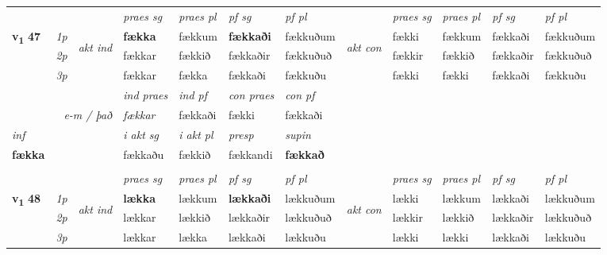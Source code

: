 \begin{longtable}[l]{X>{\footnotesize\itshape}llXXXXlXXXX}
 & &   & \textit{praes sg}  & \textit{praes pl}    & \textit{ pf sg} & \textit{pf pl} & & \textit{praes sg}  & \textit{praes pl}    & \textit{pf sg} & \textit{pf pl }  \\ \cmidrule{4-7} \cmidrule{9-12}
 \multirow{2}{*}{{{\textbf{v{\textsubscript{1}}} \Large{\textbf{47}}}}}  & 1p & \multirow{3}{*}{\begin{turn}{90}\textit{akt ind}\end{turn}} & \textbf{fækka} & fækkum & \textbf{fækkaði} & fækkuðum & \multirow{3}{*}{\begin{turn}{90}\textit{akt con}\end{turn}} &fækki & fækkum & fækkaði & fækkuðum\\*
 & 2p &  &  fækkar  & fækkið & fækkaðir & fækkuðuð & & fækkir & fækkið & fækkaðir & fækkuðuð \\*
 & 3p &  & fækkar & fækka & fækkaði & fækkuðu & & fækki & fækki& fækkaði & fækkuðu \\*
\cmidrule{4-7} \cmidrule{9-12}

   && &  \textit{ind praes} & \textit{ind pf} & \textit{con praes} & \textit{con pf} \\*
\multicolumn{3}{r}{\textit{e-m / það}} & fækkar & fækkaði & fækki & fækkaði \\*

\cmidrule{4-7}
   {\textit{inf}} & &  & \textit{i akt sg} & \textit{i akt pl}   & \textit{presp} & \textit{supin}   \\*
  {\textbf{fækka}} & && fækkaðu  & fækkið   & fækkandi &  \textbf{fækkað}   \\*

\midrule


  & \\
   \midrule
 & &   & \textit{praes sg}  & \textit{praes pl}    & \textit{ pf sg} & \textit{pf pl} & & \textit{praes sg}  & \textit{praes pl}    & \textit{pf sg} & \textit{pf pl }  \\ \cmidrule{4-7} \cmidrule{9-12}
 \multirow{2}{*}{{{\textbf{v{\textsubscript{1}}} \Large{\textbf{48}}}}}  & 1p & \multirow{3}{*}{\begin{turn}{90}\textit{akt ind}\end{turn}} & \textbf{lækka} & lækkum & \textbf{lækkaði} & lækkuðum & \multirow{3}{*}{\begin{turn}{90}\textit{akt con}\end{turn}} &lækki & lækkum & lækkaði & lækkuðum\\*
 & 2p &  &  lækkar  & lækkið & lækkaðir & lækkuðuð & & lækkir & lækkið & lækkaðir & lækkuðuð \\*
 & 3p &  & lækkar & lækka & lækkaði & lækkuðu & & lækki & lækki& lækkaði & lækkuðu \\*
\cmidrule{4-7} \cmidrule{9-12}


\end{longtable}
